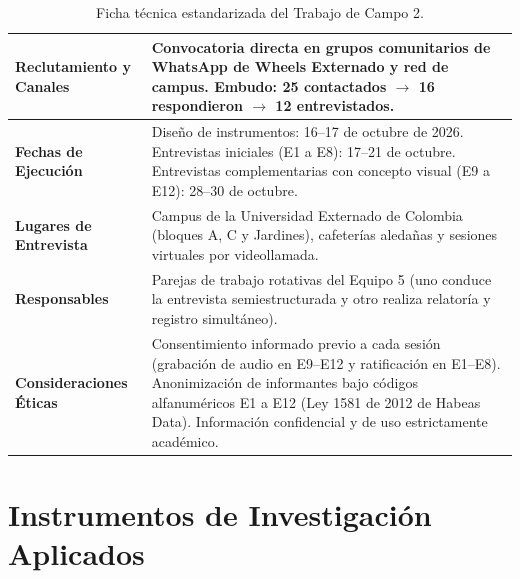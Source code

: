 \documentclass[11pt,a4paper]{article}
\begin{document}
\begin{table}[!htbp]
\begin{tabularx}{\textwidth}{>{\raggedright\arraybackslash\bfseries}p{3.8cm}X}
\midrule
Reclutamiento y Canales & Convocatoria directa en grupos comunitarios de WhatsApp de Wheels Externado y red de campus. Embudo: 25 contactados $\rightarrow$ 16 respondieron $\rightarrow$ 12 entrevistados. \\
\midrule
Fechas de Ejecuci\'on & Dise\~no de instrumentos: 16--17 de octubre de 2026. Entrevistas iniciales (E1 a E8): 17--21 de octubre. Entrevistas complementarias con concepto visual (E9 a E12): 28--30 de octubre. \\
\midrule
Lugares de Entrevista & Campus de la Universidad Externado de Colombia (bloques A, C y Jardines), cafeter\'ias aleda\~nas y sesiones virtuales por videollamada. \\
\midrule
Responsables & Parejas de trabajo rotativas del Equipo 5 (uno conduce la entrevista semiestructurada y otro realiza relator\'ia y registro simult\'aneo). \\
\midrule
Consideraciones \'Eticas & Consentimiento informado previo a cada sesi\'on (grabaci\'on de audio en E9--E12 y ratificaci\'on en E1--E8). Anonimizaci\'on de informantes bajo c\'odigos alfanum\'ericos E1 a E12 (Ley 1581 de 2012 de Habeas Data). Informaci\'on confidencial y de uso estrictamente acad\'emico. \\
\bottomrule
\end{tabularx}
\caption{Ficha t\'ecnica estandarizada del Trabajo de Campo 2.}
\label{tab:ficha_tecnica}
\end{table}

\section{Instrumentos de Investigaci\'on Aplicados}
\end{document}
